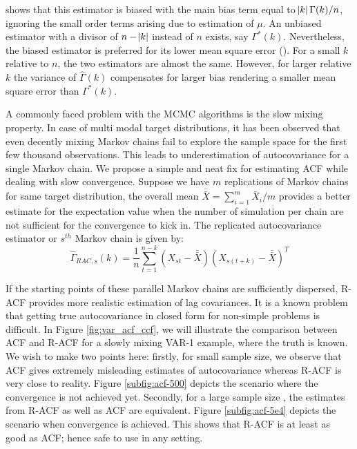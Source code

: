 \documentclass[11pt]{article}
\theoremstyle{remark}
\begin{document}
\cite{priestley1981spectral} shows that this estimator is biased with the main bias term equal to $\abs{k}\Gamma(k)/n$, ignoring the small order terms arising due to estimation of $\mu$. An unbiased estimator with a divisor of $n - \abs{k}$ instead of $n$ exists, say $\Gamma^*(k)$. Nevertheless, the biased estimator is preferred for its lower mean square error (\cite{priestley1981spectral}). For a small $k$ relative to $n$, the two estimators are almost the same. However, for larger relative $k$ the variance of $\hat{\Gamma}(k)$ compensates for larger bias rendering a smaller mean square error than $\Gamma^*(k)$. 

A commonly faced problem with the MCMC algorithms is the slow mixing property. In case of multi modal target distributions, it has been observed that even decently mixing Markov chains fail to explore the sample space for the first few thousand observations. This leads to underestimation of autocovariance for a single Markov chain. We propose a simple and neat fix for estimating ACF while dealing with slow convergence. Suppose we have $m$ replications of Markov chains for same target distribution, the overall mean $\bar{\bar{X}} = \sum_{i = 1}^{m}\bar{X}_i/m$ provides a better estimate for the expectation value when the number of simulation per chain are not sufficient for the convergence to kick in. The replicated autocovariance estimator or $s^{th}$ Markov chain is given by:
%
\[
\hat{\Gamma}_{RAC,s}(k) = \dfrac{1}{n}\sum_{t=1}^{n-k}(X_{st}-\bar{\bar{X}})(X_{s(t+k)}-\bar{\bar{X}})^T
\]

If the starting points of these parallel Markov chains are sufficiently dispersed, R-ACF provides more realistic estimation of lag covariances. It is a known problem that getting true autocovariance in closed form for non-simple problems is difficult. In Figure \ref{fig:var_acf_ccf}, we will illustrate the comparison between ACF and R-ACF for a slowly mixing VAR-1 example, where the truth is known. We wish to make two points here: firstly, for small sample size, we observe that ACF gives extremely misleading estimates of autocovariance whereas R-ACF is very close to reality. Figure \ref{subfig:acf-500} depicts the scenario where the convergence is not achieved yet. Secondly, for a large sample size , the estimates from R-ACF as well as ACF are equivalent. Figure \ref{subfig:acf-5e4} depicts the scenario when convergence is achieved. This shows that R-ACF is at least as good as ACF; hence safe to use in any setting.
\end{document}
